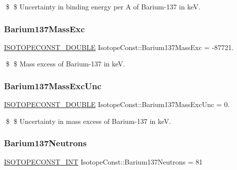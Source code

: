 \$ \$ Uncertainty in binding energy per A of Barium-\/137 in keV. \mbox{\label{group___isotope_const-_barium-_ba137_ga1e39fc97532302801b942f3fa8a0667f}} 
\subsubsection{\texorpdfstring{Barium137\+Mass\+Exc}{Barium137MassExc}}
{\footnotesize\ttfamily \mbox{\hyperlink{group___isotope_const-_macros_ga8f45a7272ce02c0b4c65c44636ed719a}{I\+S\+O\+T\+O\+P\+E\+C\+O\+N\+S\+T\+\_\+\+D\+O\+U\+B\+LE}} Isotope\+Const\+::\+Barium137\+Mass\+Exc = -\/87721.}

\$ \$ Mass excess of Barium-\/137 in keV. \mbox{\label{group___isotope_const-_barium-_ba137_ga2c714b62de7db36ffbff74812cd0af22}} 
\subsubsection{\texorpdfstring{Barium137\+Mass\+Exc\+Unc}{Barium137MassExcUnc}}
{\footnotesize\ttfamily \mbox{\hyperlink{group___isotope_const-_macros_ga8f45a7272ce02c0b4c65c44636ed719a}{I\+S\+O\+T\+O\+P\+E\+C\+O\+N\+S\+T\+\_\+\+D\+O\+U\+B\+LE}} Isotope\+Const\+::\+Barium137\+Mass\+Exc\+Unc = 0.}

\$ \$ Uncertainty in mass excess of Barium-\/137 in keV. \mbox{\label{group___isotope_const-_barium-_ba137_gaeb06c4c0d20d4e82bdf382552cfea664}} 
\subsubsection{\texorpdfstring{Barium137\+Neutrons}{Barium137Neutrons}}
{\footnotesize\ttfamily \mbox{\hyperlink{group___isotope_const-_macros_ga5f18360b3e99483a35c32d789e62621c}{I\+S\+O\+T\+O\+P\+E\+C\+O\+N\+S\+T\+\_\+\+I\+NT}} Isotope\+Const\+::\+Barium137\+Neutrons = 81}

